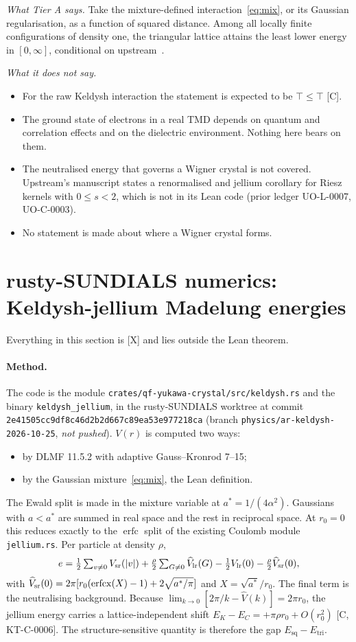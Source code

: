 \documentclass[11pt]{article}
\theoremstyle{remark}
\newcommand{\tier}[1]{\textsf{[#1]}}
\newcommand{\erfcx}{\operatorname{erfcx}}
\begin{document}
\emph{What Tier A says.} Take the mixture-defined interaction~\eqref{eq:mix}, or its Gaussian regularisation, as a
function of squared distance. Among all locally finite configurations of density one, the triangular lattice attains
the least lower energy in $[0,\infty]$, conditional on upstream~\cite{oai}.

\emph{What it does not say.}
\begin{itemize}
\item For the raw Keldysh interaction the statement is expected to be $\top\le\top$ \tier{C}.
\item The ground state of electrons in a real TMD depends on quantum and correlation effects and on the dielectric
environment. Nothing here bears on them.
\item The neutralised energy that governs a Wigner crystal is not covered. Upstream's manuscript states a renormalised and
jellium corollary for Riesz kernels with $0\le s<2$, which is not in its Lean code (prior ledger UO-L-0007,
UO-C-0003).
\item No statement is made about where a Wigner crystal forms.
\end{itemize}

\section{rusty-SUNDIALS numerics: Keldysh-jellium Madelung energies}\label{sec:num}
Everything in this section is \tier{X} and lies outside the Lean theorem.

\paragraph{Method.} The code is the module \texttt{crates/qf-yukawa-crystal/src/keldysh.rs} and the binary
\texttt{keldysh\_jellium}, in the rusty-SUNDIALS worktree at commit \texttt{2e41505cc9df8c46d2b2d667c89ea53e977218ca}
(branch \texttt{physics/ar-keldysh-2026-10-25}, \emph{not pushed}). $V(r)$ is computed two ways:
\begin{itemize}
\item by DLMF 11.5.2 with adaptive Gauss--Kronrod 7--15;
\item by the Gaussian mixture~\eqref{eq:mix}, the Lean definition.
\end{itemize}
The Ewald split is made in the mixture variable at $a^*=1/(4\alpha^2)$. Gaussians with $a<a^*$ are summed in real space
and the rest in reciprocal space. At $r_0=0$ this reduces exactly to the $\operatorname{erfc}$ split of the existing
Coulomb module \texttt{jellium.rs}. Per particle at density $\rho$,
\[
e=\tfrac12\textstyle\sum_{v\ne0}V_{\rm sr}(|v|)+\frac\rho2\sum_{G\ne0}\widehat V_{\rm lr}(G)-\tfrac12V_{\rm lr}(0)
-\frac\rho2\widehat V_{\rm sr}(0),
\]
with $\widehat V_{\rm sr}(0)=2\pi[r_0(\erfcx(X)-1)+2\sqrt{a^*/\pi}]$ and $X=\sqrt{a^*}/r_0$. The final term is the
neutralising background. Because $\lim_{k\to0}[2\pi/k-\widehat V(k)]=2\pi r_0$, the jellium energy carries a
lattice-independent shift $E_K-E_C=+\pi\rho r_0+O(r_0^2)$ \tier{C, KT-C-0006}. The structure-sensitive quantity is
therefore the gap $E_\mathrm{sq}-E_\mathrm{tri}$.
\end{document}
